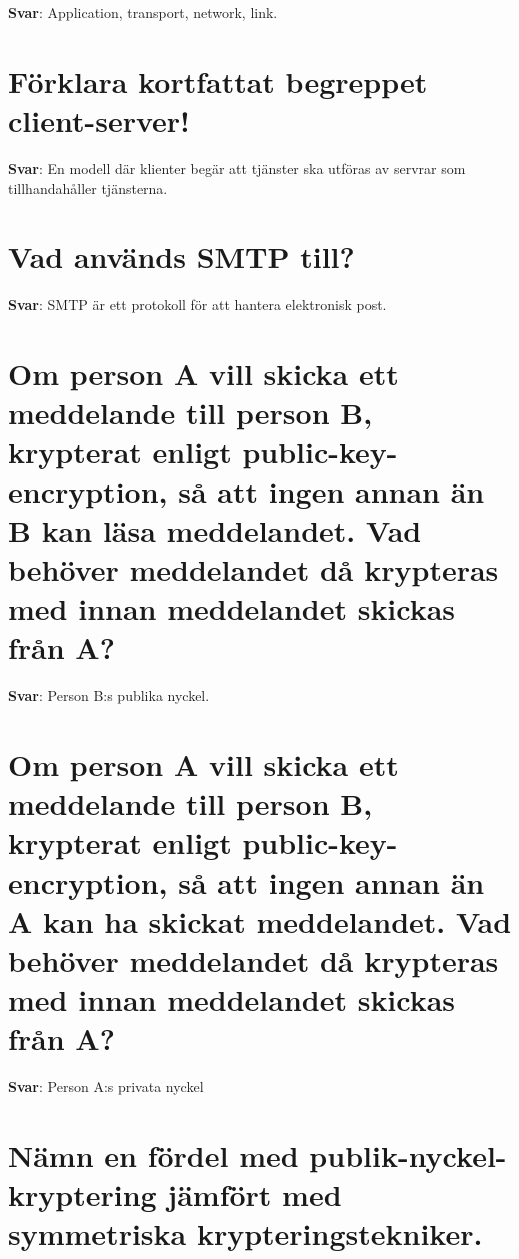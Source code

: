 \documentclass[a4paper,11pt,oneside]{book}
\begin{document}
\begin{sloppypar}
\label{q:165:sa:sv:True}

\textbf{Svar}: Application, transport, network, link.



\section{F\"orklara kortfattat begreppet client-server!}

\label{q:166:sa:sv:True}

\textbf{Svar}: En modell d\"ar klienter beg\"ar att tj\"anster ska utf\"oras av servrar som tillhandah\r{a}ller tj\"ansterna.



\section{Vad anv\"ands SMTP till?}

\label{q:167:sa:sv:True}

\textbf{Svar}: SMTP \"ar ett protokoll f\"or att hantera elektronisk post.



\section{Om person A vill skicka ett meddelande till person B, krypterat enligt public-key-encryption, s\r{a} att ingen annan \"an B kan l\"asa meddelandet. Vad beh\"over meddelandet d\r{a} krypteras med innan meddelandet skickas fr\r{a}n A?}

\label{q:168:sa:sv:True}

\textbf{Svar}: Person B:s publika nyckel.



\section{Om person A vill skicka ett meddelande till person B, krypterat enligt public-key-encryption, s\r{a} att ingen annan \"an A kan ha skickat meddelandet. Vad beh\"over meddelandet d\r{a} krypteras med innan meddelandet skickas fr\r{a}n A?}

\label{q:169:sa:sv:True}

\textbf{Svar}: Person A:s privata nyckel



\section{N\"amn en f\"ordel med publik-nyckel-kryptering j\"amf\"ort med symmetriska krypteringstekniker.}


\end{sloppypar}
\end{document}
